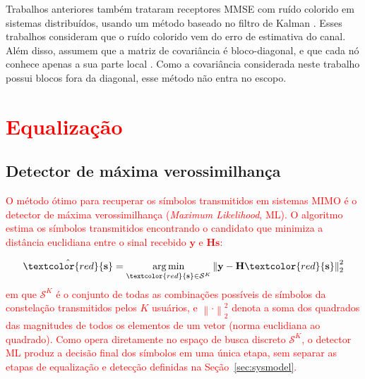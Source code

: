 
Trabalhos anteriores também trataram receptores MMSE com ruído colorido em sistemas distribuídos, usando um método baseado no filtro de Kalman \cite{zhao-lmmse}. Esses trabalhos consideram que o ruído colorido vem do erro de estimativa do canal. Além disso, assumem que a matriz de covariância é bloco-diagonal, e que cada nó conhece apenas a sua parte local \cite{zhao-lmmse}. Como a covariância considerada neste trabalho possui blocos fora da diagonal, esse método não entra no escopo.



\section[\texorpdfstring{\textcolor{red}{Equalização}}{Equalização}]{\textcolor{red}{Equalização}}
\label{sec:equalization}

\subsection{Detector de máxima verossimilhança}
\textcolor{red}{O método ótimo para recuperar os símbolos transmitidos em sistemas MIMO é o detector de máxima verossimilhança (\textit{Maximum Likelihood}, ML). O algoritmo estima os símbolos transmitidos encontrando o candidato que minimiza a distância euclidiana entre o sinal recebido $\mathbf{y}$ e $\mathbf{H}\mathbf{s}$:}

\begin{equation}
\hat{\textcolor{red}{\mathbf{s}}} = \underset{\textcolor{red}{\mathbf{s}} \in \mathcal{S}^{K}}{\arg\min}
\left\|\mathbf{y} - \mathbf{H}\textcolor{red}{\mathbf{s}}\right\|_2^2
\label{eq:ml}
\end{equation}
\textcolor{red}{em que $\mathcal{S}^{K}$ é o conjunto de todas as combinações possíveis de símbolos da constelação transmitidos pelos $K$ usuários, e $\left\|\cdot\right\|_2^2$ denota a soma dos quadrados das magnitudes de todos os elementos de um vetor (norma euclidiana ao quadrado). Como opera diretamente no espaço de busca discreto $\mathcal{S}^{K}$, o detector ML produz a decisão final dos símbolos em uma única etapa, sem separar as etapas de equalização e detecção definidas na Seção~\ref{sec:sysmodel}.}

